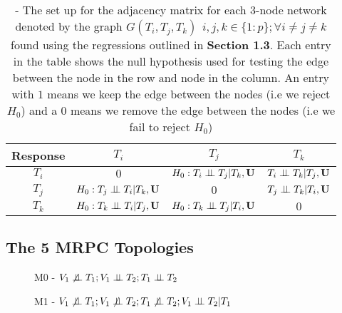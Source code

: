 \documentclass[12pt]{report}
\begin{document}
\begin{table}[H]
\centering
\caption{- The set up for the adjacency matrix for each 3-node network denoted by the graph $G(T_i, T_j, T_k) \ \ i,j,k\in\{1:p\}; \forall i\neq j\neq k$ found using the regressions outlined in \textbf{Section 1.3}. Each entry in the table shows the null hypothesis used for testing the edge between the node in the row and node in the column. An entry with $1$ means we keep the edge between the nodes (i.e we reject $H_0$) and a $0$ means we remove the edge between the nodes (i.e we fail to reject $H_0$)}
\begin{tabular}{|c||c|c|c|}
\hline
\bf Response  & $T_i$                                                 &  $T_j$                                           & $T_k$    \\ \hline \hline
$T_i$                &  $0$                                                  & $H_0: T_i \perp \!\!\! \perp T_j|T_k, {\bf U}$   & $T_i\perp \!\!\! \perp T_k |T_j, {\bf U}$                    \\ \hline 
$T_j$               &  $H_0: T_j \perp \!\!\! \perp T_i| T_k, {\bf U}$    &  $0$                                               & $T_j\perp \!\!\! \perp T_k|T_i, {\bf U}$                 \\ \hline
$T_k$               & $H_0: T_k \perp \!\!\! \perp T_i|T_j, {\bf U}$      &  $H_0: T_k \perp \!\!\! \perp T_j|T_i, {\bf U}$  & $0$                \\ \hline


\end{tabular}
\end{table}

\subsection*{The 5 MRPC Topologies}

\begin{figure}[H]
\begin{center}
\end{center}
\caption{M0 - $V_1\not\indep T_1 ; V_1 \indep T_2; T_1 \indep T_2$ }
\end{figure}


\begin{figure}[H]
\begin{center}
\end{center}
\caption{M1 - $V_1\not\indep T_1 ; V_1 \not\indep T_2; T_1 \not\indep T_2; V_1 \indep T_2 | T_1$}
\end{figure}
\end{document}
